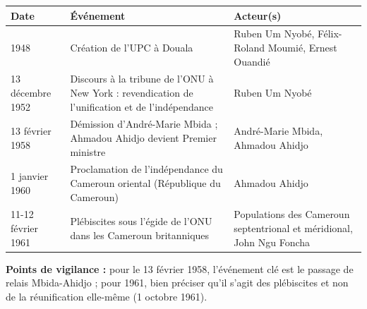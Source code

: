 \documentclass[11pt]{article}
\begin{document}
\begin{corrige}
\begin{center}
\begin{tabularx}{\linewidth}{|l|X|X|}
\hline
\rowcolor{popblueL} \textbf{Date} & \textbf{Événement} & \textbf{Acteur(s)} \\
\hline
1948 & Création de l'UPC à Douala & Ruben Um Nyobé, Félix-Roland Moumié, Ernest Ouandié \\
\hline
13 décembre 1952 & Discours à la tribune de l'ONU à New York : revendication de l'unification et de l'indépendance & Ruben Um Nyobé \\
\hline
13 février 1958 & Démission d'André-Marie Mbida ; Ahmadou Ahidjo devient Premier ministre & André-Marie Mbida, Ahmadou Ahidjo \\
\hline
1\ier{} janvier 1960 & Proclamation de l'indépendance du Cameroun oriental (République du Cameroun) & Ahmadou Ahidjo \\
\hline
11-12 février 1961 & Plébiscites sous l'égide de l'ONU dans les Cameroun britanniques & Populations des Cameroun septentrional et méridional, John Ngu Foncha \\
\hline
\end{tabularx}
\end{center}
\textbf{Points de vigilance :} pour le 13 février 1958, l'événement clé est le passage de relais Mbida-Ahidjo ; pour 1961, bien préciser qu'il s'agit des plébiscites et non de la réunification elle-même (1\ier{} octobre 1961).
\end{corrige}
\end{document}
